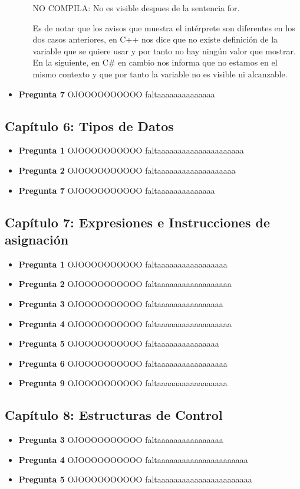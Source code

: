 \documentclass[12pt,oneside]{article}
\begin{document}
\begin{itemize}
\begin{itemize}
\begin{center}
								NO COMPILA: No es visible despues de la sentencia for.
							\end{center}
							Es de notar que los avisos que muestra el intérprete son diferentes en los dos casos anteriores, en C++ nos dice que no existe definición de la variable que se quiere usar y por tanto no hay ningún valor que mostrar. En la 									siguiente, en C\# en cambio nos informa que no estamos en el mismo contexto y que por tanto la variable no es visible ni alcanzable.
					\end{itemize}
				\item {\bf Pregunta 7}	
					OJOOOOOOOOOO faltaaaaaaaaaaaaaa
		\end{itemize}


		\subsection{Capítulo 6: Tipos de Datos}
			\begin{itemize}
				\item {\bf Pregunta 1}
					OJOOOOOOOOOO faltaaaaaaaaaaaaaaaaaaaaa
				\item {\bf Pregunta 2}
					OJOOOOOOOOOO faltaaaaaaaaaaaaaaaaaaa
				\item {\bf Pregunta 7}
					OJOOOOOOOOOO faltaaaaaaaaaaaaaa
				\end{itemize}

		\subsection{Capítulo 7: Expresiones e Instrucciones de asignación}	
			\begin{itemize}
				\item {\bf Pregunta 1}
					OJOOOOOOOOOO faltaaaaaaaaaaaaaaaaa
				\item {\bf Pregunta 2}
					OJOOOOOOOOOO faltaaaaaaaaaaaaaaaaaa
				\item {\bf Pregunta 3}
					OJOOOOOOOOOO faltaaaaaaaaaaaaaaaa
				\item {\bf Pregunta 4}
					OJOOOOOOOOOO faltaaaaaaaaaaaaaaaaaa
				\item {\bf Pregunta 5}
					OJOOOOOOOOOO faltaaaaaaaaaaaaaaa
				\item {\bf Pregunta 6}
					OJOOOOOOOOOO faltaaaaaaaaaaaaaaaaa
				\item {\bf Pregunta 9}
					OJOOOOOOOOOO faltaaaaaaaaaaaaaaaaa
				\end{itemize}

		\subsection{Capítulo 8: Estructuras de Control}	
			\begin{itemize}
				\item {\bf Pregunta 3}		
					OJOOOOOOOOOO faltaaaaaaaaaaaaaaaa
				\item {\bf Pregunta 4}
					OJOOOOOOOOOO faltaaaaaaaaaaaaaaaaaaaaaa
				\item {\bf Pregunta 5}
					OJOOOOOOOOOO faltaaaaaaaaaaaaaaaaaaaaaaa
			\end{itemize}
\end{document}
